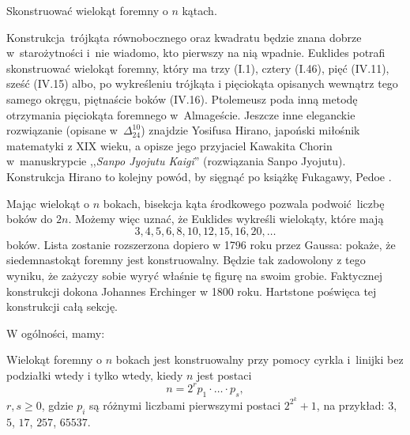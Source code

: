 \begin{problem}
    Skonstruować wielokąt foremny o $n$ kątach.
\end{problem}

Konstrukcja trójkąta równobocznego oraz kwadratu będzie znana dobrze w~starożytności i~nie wiadomo, kto pierwszy na nią wpadnie.
Euklides potrafi skonstruować wielokąt foremny, który ma trzy (I.1), cztery (I.46), pięć (IV.11), sześć (IV.15) albo, po wykreśleniu trójkąta i pięciokąta opisanych wewnątrz tego samego okręgu, piętnaście boków (IV.16).
%
Ptolemeusz poda inną metodę otrzymania pięciokąta foremnego w~Almageście.
%
Jeszcze inne eleganckie rozwiązanie (opisane w~$\Delta_{24}^{10}$) znajdzie Yosifusa Hirano, japoński miłośnik matematyki z XIX wieku, a opisze jego przyjaciel Kawakita Chorin w~manuskrypcie ,,\emph{Sanpo Jyojutu Kaigi}'' (rozwiązania Sanpo Jyojutu).
%
Konstrukcja Hirano to kolejny powód, by sięgnąć po książkę Fukagawy, Pedoe \cite{fukagawa_1989}.

Mając wielokąt o $n$ bokach, bisekcja kąta środkowego pozwala podwoić liczbę boków do $2n$.
Możemy więc uznać, że Euklides wykreśli wielokąty, które mają
\begin{equation}
    3, 4, 5, 6, 8, 10, 12, 15, 16, 20, \ldots
\end{equation}
boków.
Lista zostanie rozszerzona dopiero w 1796 roku przez Gaussa: pokaże, że siedemnastokąt foremny jest konstruowalny.
%
%
Będzie tak zadowolony z tego wyniku, że zażyczy sobie wyryć właśnie tę figurę na swoim grobie.
Faktycznej konstrukcji dokona Johannes Erchinger w 1800 roku.
%
Hartstone \cite[s. 250-259]{hartshorne2000} poświęca tej konstrukcji całą sekcję.

W ogólności, mamy:
\begin{theorem}
    \label{gauss_wantzel}
    Wielokąt foremny o $n$ bokach jest konstruowalny przy pomocy cyrkla i~linijki bez podziałki wtedy i tylko wtedy, kiedy $n$ jest postaci
    \begin{equation}
        n = 2^r p_1 \cdot \ldots \cdot p_s,
    \end{equation}
    $r, s \ge 0$, gdzie $p_i$ są różnymi liczbami pierwszymi postaci $2^{2^k} + 1$, na przykład: $3$, $5$, $17$, $257$, $65537$.
\end{theorem}

